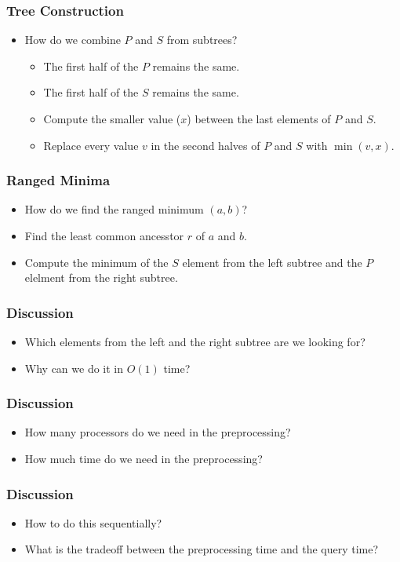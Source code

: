 \documentclass{beamer}
\begin{document}
\begin{CJK}{UTF8}{bsmi}
\begin{frame}
\frametitle{Tree Construction}
\begin{itemize}
\item How do we combine $P$ and $S$ from subtrees?
  \begin{itemize}
  \item The first half of the $P$ remains the same.
  \item The first half of the $S$ remains the same.
  \item Compute the smaller value ($x$) between the last elements of $P$ and $S$.
  \item Replace every value $v$ in the second halves of $P$ and $S$ with $\min(v, x)$.
  \end{itemize}
\end{itemize}
\end{frame}

\begin{frame}
\frametitle{Ranged Minima}
\begin{itemize}
\item How do we find the ranged minimum $(a, b)$?
\item Find the least common ancesstor $r$ of $a$ and $b$.
\item Compute the minimum of the $S$ element from the left subtree and the $P$ elelment from the right subtree.
\end{itemize}
\end{frame}

\begin{frame}
\frametitle{Discussion}
\begin{itemize}
\item Which elements from the left and the right subtree are we looking for?
\item Why can we do it in $O(1)$ time?

\end{itemize}
\end{frame}

\begin{frame}
\frametitle{Discussion}
\begin{itemize}
\item How many processors do we need in the preprocessing?
\item How much time do we need in the preprocessing?
\end{itemize}
\end{frame}

\begin{frame}
\frametitle{Discussion}
\begin{itemize}
\item How to do this sequentially?
\item What is the tradeoff between the preprocessing time and the query time?
\end{itemize}
\end{frame}


\end{CJK}
\end{document}
